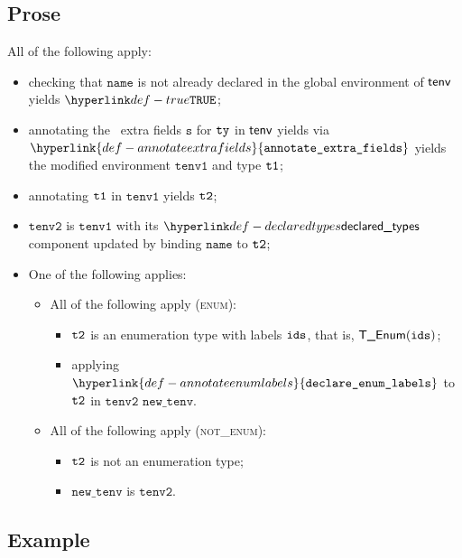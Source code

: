 \documentclass{book}
\newcommand\ProseOrTypeError[0]{\ProseTerminateAs{\TypeErrorConfig}}
\newcommand\annotateextrafields[0]{\hyperlink{def-annotateextrafields}{\texttt{annotate\_extra\_fields}}}
\newcommand\declareenumlabels[0]{\hyperlink{def-annotateenumlabels}{\texttt{declare\_enum\_labels}}}
\newcommand\newtenv[0]{\texttt{new\_tenv}}
\newcommand\tenvone[0]{\texttt{tenv1}}
\newcommand\tenvtwo[0]{\texttt{tenv2}}
\newcommand\vs[0]{\texttt{s}}
\newcommand\name[0]{\texttt{name}}
\begin{document}
\subsection{Prose}
All of the following apply:
\begin{itemize}
  \item checking that $\name$ is not already declared in the global environment of $\textsf{tenv}$ yields $\True$\ProseOrTypeError;
  \item annotating the \optional\ extra fields $\vs$ for $\texttt{ty}$ in $\textsf{tenv}$ yields via \\ $\annotateextrafields$
        yields the modified environment $\tenvone$ and type $\texttt{t1}$\ProseOrTypeError;
  \item annotating $\texttt{t1}$ in $\tenvone$ yields $\texttt{t2}$\ProseOrTypeError;
  \item $\tenvtwo$ is $\tenvone$ with its $\declaredtypes$ component updated by binding $\name$ to $\texttt{t2}$;
  \item One of the following applies:
  \begin{itemize}
    \item All of the following apply (\textsc{enum}):
    \begin{itemize}
      \item $\texttt{t2}$ is an enumeration type with labels $\texttt{ids}$, that is, $\textsf{T\_Enum}(\texttt{ids})$;
      \item applying $\declareenumlabels$ to $\texttt{t2}$ in $\tenvtwo$ $\newtenv$\ProseOrTypeError.
    \end{itemize}

    \item All of the following apply (\textsc{not\_enum}):
    \begin{itemize}
      \item $\texttt{t2}$ is not an enumeration type;
      \item $\newtenv$ is $\tenvtwo$.
    \end{itemize}
  \end{itemize}
\end{itemize}

\subsection{Example}

\end{document}
